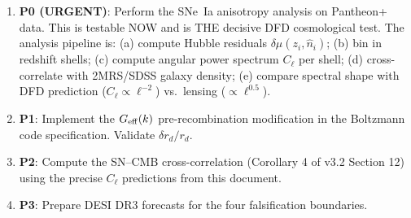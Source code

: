 \documentclass[11pt,a4paper]{article}
\newcommand{\Geff}{G_{\rm eff}}
\begin{document}
\begin{enumerate}
\item \textbf{P0 (URGENT)}: Perform the SNe~Ia anisotropy analysis
  on Pantheon+ data.  This is testable NOW and is THE decisive DFD
  cosmological test.  The analysis pipeline is: (a) compute Hubble
  residuals $\delta\mu(z_i, \hat{n}_i)$; (b) bin in redshift shells;
  (c) compute angular power spectrum $C_\ell$ per shell;
  (d) cross-correlate with 2MRS/SDSS galaxy density;
  (e) compare spectral shape with DFD prediction
  ($C_\ell \propto \ell^{-2}$) vs.\ lensing ($\propto \ell^{0.5}$).

\item \textbf{P1}: Implement the $\Geff(k)$ pre-recombination
  modification in the Boltzmann code specification.  Validate
  $\delta r_d/r_d$.

\item \textbf{P2}: Compute the SN--CMB cross-correlation
  (Corollary 4 of v3.2 Section 12) using the precise $C_\ell$
  predictions from this document.

\item \textbf{P3}: Prepare DESI DR3 forecasts for the four
  falsification boundaries.
\end{enumerate}
\end{document}
